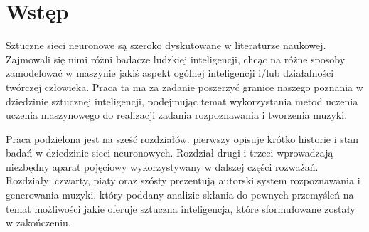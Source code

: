 \section*{Wstęp}

\noindent Sztuczne sieci neuronowe są szeroko dyskutowane w literaturze naukowej. Zajmowali się nimi różni badacze ludzkiej inteligencji, chcąc na różne sposoby zamodelować w maszynie jakiś aspekt ogólnej inteligencji i/lub działalności twórczej człowieka. Praca ta ma za zadanie poszerzyć granice naszego poznania w dziedzinie sztucznej inteligencji, podejmując temat wykorzystania metod uczenia uczenia maszynowego do realizacji zadania rozpoznawania i tworzenia muzyki.

Praca podzielona jest na sześć rozdziałów. pierwszy opisuje krótko historie i stan badań w dziedzinie sieci neuronowych. Rozdział drugi i trzeci wprowadzają niezbędny aparat pojęciowy wykorzystywany w dalszej części rozważań. Rozdziały: czwarty, piąty oraz szósty prezentują autorski system rozpoznawania i generowania muzyki, który poddany analizie skłania do pewnych przemyśleń na temat możliwości jakie oferuje sztuczna inteligencja, które sformułowane zostały w zakończeniu.


